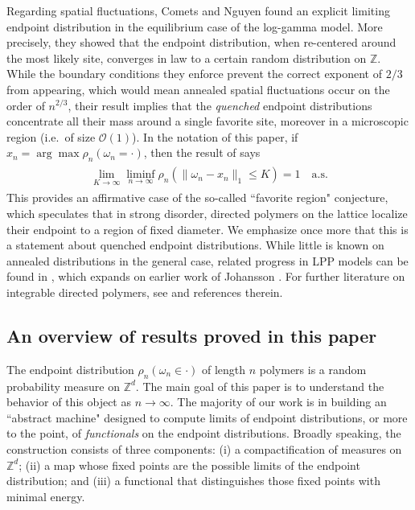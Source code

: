 \documentclass[11pt,reqno]{amsart}
\numberwithin{equation}{section}
\theoremstyle{definition}
\begin{document}
Regarding spatial fluctuations, Comets and Nguyen \cite{comets-nguyen15} found an explicit limiting endpoint distribution in the equilibrium case of the log-gamma model.
More precisely, they showed that the endpoint distribution, when re-centered around the most likely site, converges in law to a certain random distribution on ${\mathbb{Z}}$. 
While the boundary conditions they enforce prevent the correct exponent of $2/3$ from appearing, which would mean annealed spatial fluctuations occur on the order of $n^{2/3}$, their result implies that the \textit{quenched} endpoint distributions concentrate all their mass around a single favorite site, moreover in a microscopic region (i.e.~of size ${\mathcal{O}}(1)$).
In the notation of this paper, if $x_n = \arg \max \rho_n(\omega_n = \cdot)$, then the result of \cite{comets-nguyen15} says
{\begin{align} \begin{split} {
\lim_{K \to \infty} \liminf_{n \to \infty} \rho_n(\|\omega_n - x_n\|_1 \leq K) = 1 \quad \mathrm{a.s.}\label{mode}
} \end{split} \end{align}}
This provides an affirmative case of the so-called ``favorite region" conjecture, which speculates that in strong disorder, directed polymers on the lattice localize their endpoint to a region of fixed diameter. 
We emphasize once more that this is a statement about quenched endpoint distributions.
While little is known on annealed distributions in the general case, related progress in LPP models can be found in \cite{flores-quastel-remenik13}, which expands on earlier work of Johansson \cite{johansson03}.
For further literature on integrable directed polymers, see \cite{corwin-seppalainen-shen15,barraquand-corwin15,thiery-doussal15} and references therein.

 \setcounter{thm}{0}

\subsection{An overview of results proved in this paper} \label{results}
The endpoint distribution $\rho_n(\omega_n \in \cdot)$ of length $n$ polymers is a random probability measure on $\mathbb{Z}^d$. The main goal of this paper is to understand the behavior of this object as $n\to\infty$.
The majority of our work is in building an ``abstract machine" designed to compute limits of endpoint distributions, or more to the point, of \textit{functionals} on the endpoint distributions.
Broadly speaking, the construction consists of three components: (i) a compactification of measures on ${\mathbb{Z}}^d$; (ii) a map whose fixed points are the possible limits of the endpoint distribution; and (iii) a functional that distinguishes those fixed points with minimal energy.
\end{document}
